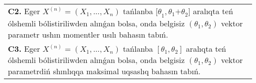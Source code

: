 \documentclass{article}
\begin{document}
\begin{tabular}{m{17cm}}
 \\
\textbf{C2.} 
Eger \(X^{(n)} = \left( X_{1},...,X_{n} \right)\) tańlanba \({\lbrack\theta}_{1},\theta_{1}{+ \theta}_{2}\rbrack\) aralıqta teń ólshemli bólistiriliwden alınǵan bolsa, onda belgisiz \(\left( \theta_{1},\theta_{2} \right)\) vektor parametr ushın momentler usılı bahasın tabıń.
 \\
\textbf{C3.} 
Eger \(X^{(n)} = \left( X_{1},...,X_{n} \right)\) tańlanba \(\left\lbrack \theta_{1},\theta_{2} \right\rbrack\) aralıqta teń ólshemli bólistiriliwden alınǵan bolsa, onda belgisiz \(\left( \theta_{1},\theta_{2} \right)\) vektor parametrdiń shınlıqqa maksimal uqsaslıq bahasın tabıń.
 \\

\end{tabular}
\vspace{1cm}
\end{document}
